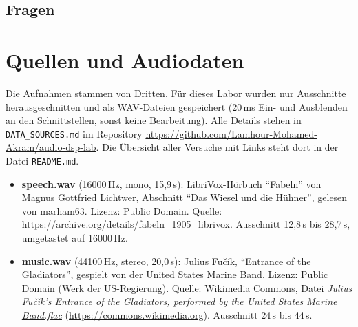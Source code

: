 \documentclass[11pt]{article}
\begin{document}
\subsection*{Fragen}
\begin{enumerate}[label=\arabic*.]
\end{enumerate}

\section{Quellen und Audiodaten}

Die Aufnahmen stammen von Dritten. Für dieses Labor wurden nur Ausschnitte herausgeschnitten und als WAV-Dateien gespeichert (20\,ms Ein- und Ausblenden an den Schnittstellen, sonst keine Bearbeitung). Alle Details stehen in \texttt{DATA\_SOURCES.md} im Repository \url{https://github.com/Lamhour-Mohamed-Akram/audio-dsp-lab}. Die Übersicht aller Versuche mit Links steht dort in der Datei \texttt{README.md}.

{\small
\begin{itemize}
  \item \textbf{speech.wav} (16000\,Hz, mono, 15,9\,s): LibriVox-Hörbuch "`Fabeln"' von Magnus Gottfried Lichtwer, Abschnitt "`Das Wiesel und die Hühner"', gelesen von marham63. Lizenz: Public Domain. Quelle: \url{https://archive.org/details/fabeln_1905_librivox}. Ausschnitt 12,8\,s bis 28,7\,s, umgetastet auf 16000\,Hz.
  \item \textbf{music.wav} (44100\,Hz, stereo, 20,0\,s): Julius Fučík, "`Entrance of the Gladiators"', gespielt von der United States Marine Band. Lizenz: Public Domain (Werk der US-Regierung). Quelle: Wikimedia Commons, Datei \href{https://commons.wikimedia.org/wiki/File:Julius_Fu%C4%8D%C3%ADk%27s_%22Entrance_of_the_Gladiators%22,_performed_by_the_United_States_Marine_Band.flac}{\textit{Julius Fučík's Entrance of the Gladiators, performed by the United States Marine Band.flac}} (\url{https://commons.wikimedia.org}). Ausschnitt 24\,s bis 44\,s.
\end{itemize}}
\end{document}
